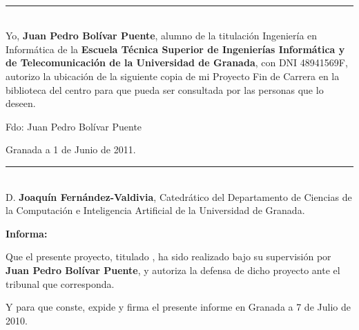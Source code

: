 \\


\cleardoublepage
\thispagestyle{empty}
\noindent\rule[-1ex]{\textwidth}{2pt}\\[4.5ex]

Yo, \textbf{Juan Pedro Bolívar Puente}, alumno de la titulación
Ingeniería en Informática de la \textbf{Escuela Técnica Superior de
  Ingenierías Informática y de Telecomunicación de la Universidad de
  Granada}, con DNI 48941569F, autorizo la ubicación de la siguiente
copia de mi Proyecto Fin de Carrera en la biblioteca del centro para
que pueda ser consultada por las personas que lo deseen.

\vspace{6cm}
\noindent Fdo: Juan Pedro Bolívar Puente

\vspace{2cm}

\begin{flushright}
Granada a 1 de Junio de 2011.
\end{flushright}



\clearpage
\thispagestyle{empty}
\noindent\rule[-1ex]{\textwidth}{2pt}\\[4.5ex]

D. \textbf{Joaquín Fernández-Valdivia}, Catedrático del Departamento
de Ciencias de la Computación e Inteligencia Artificial de la
Universidad de Granada.  \vspace{0.5cm}

\textbf{Informa:}
\vspace{0.5cm}

Que el presente proyecto, titulado \textit{\textbf{\myTitle}}, ha sido
realizado bajo su supervisión por \textbf{Juan Pedro Bolívar Puente},
y autoriza la defensa de dicho proyecto ante el tribunal que
corresponda.  \vspace{0.5cm}

Y para que conste, expide y firma el presente informe en Granada a 7
de Julio de 2010.
\vspace{1cm}


